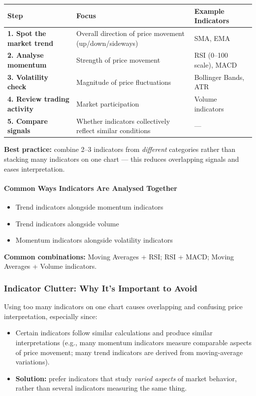 \documentclass[12pt,openany]{book}
\begin{document}
\begin{center}
\scriptsize
\renewcommand{\arraystretch}{1.2}
\begin{tabular}{|L{0.17\textwidth}|L{0.43\textwidth}|L{0.30\textwidth}|}
\hline
 \textbf{Step} & \textbf{Focus} & \textbf{Example Indicators} \\ \hline
 \textbf{1. Spot the market trend} & Overall direction of price movement (up/down/sideways) & SMA, EMA \\ \hline
 \textbf{2. Analyse momentum} & Strength of price movement & RSI (0--100 scale), MACD \\ \hline
 \textbf{3. Volatility check} & Magnitude of price fluctuations & Bollinger Bands, ATR \\ \hline
 \textbf{4. Review trading activity} & Market participation & Volume indicators \\ \hline
 \textbf{5. Compare signals} & Whether indicators collectively reflect similar conditions & --- \\ \hline
\end{tabular}
\end{center}

\textbf{Best practice:} combine 2--3 indicators from \emph{different} categories rather than stacking many indicators on one chart --- this reduces overlapping signals and eases interpretation.

\paragraph{Common Ways Indicators Are Analysed Together}

\begin{itemize}[leftmargin=*]
    \item Trend indicators alongside momentum indicators
    \item Trend indicators alongside volume
    \item Momentum indicators alongside volatility indicators
\end{itemize}

\textbf{Common combinations:} Moving Averages + RSI; RSI + MACD; Moving Averages + Volume indicators.

\subsubsection{Indicator Clutter: Why It's Important to Avoid}

Using too many indicators on one chart causes overlapping and confusing price interpretation, especially since:
\begin{itemize}[leftmargin=*]
    \item Certain indicators follow similar calculations and produce similar interpretations (e.g., many momentum indicators measure comparable aspects of price movement; many trend indicators are derived from moving-average variations).
    \item \textbf{Solution:} prefer indicators that study \emph{varied aspects} of market behavior, rather than several indicators measuring the same thing.
\end{itemize}
\end{document}
